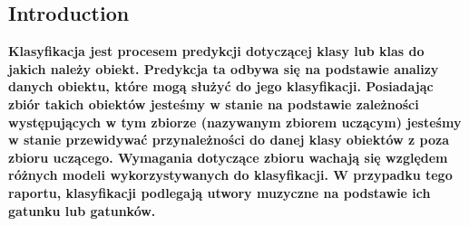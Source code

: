 \begin{multicols}{2}
\tableofcontents
\section{Introduction}
\textbf{Klasyfikacja jest procesem predykcji dotyczącej klasy lub klas do jakich należy obiekt. Predykcja ta odbywa się na podstawie analizy danych obiektu, które mogą służyć do jego klasyfikacji. Posiadając zbiór takich obiektów jesteśmy w stanie na podstawie zależności występujących w tym zbiorze (nazywanym zbiorem uczącym) jesteśmy w stanie przewidywać przynależności do danej klasy obiektów z poza zbioru uczącego. Wymagania dotyczące zbioru wachają się względem różnych modeli wykorzystywanych do klasyfikacji. W przypadku tego raportu, klasyfikacji podlegają utwory muzyczne na podstawie ich gatunku lub gatunków.}
\end{multicols}